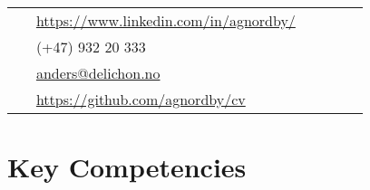 \documentclass[10pt]{article} %
\begin{document}
\begin{paracol}{2}

\parbox[top][0.12\textheight][c]{\linewidth}{ %
	\vspace{-0.04\textheight} %
	\colorbox{shade}{ %
		\begin{supertabular}{p{0.05\linewidth}|p{0.775\linewidth}} %
			\raisebox{-1pt}{\faLinkedinSquare} & \href{https://www.linkedin.com/in/agnordby/}{https://www.linkedin.com/in/agnordby/} \\ %
			\raisebox{-1pt}{\faPhone} & (+47) 932 20 333 \\ %
			\raisebox{0pt}{\small\faEnvelope} & \href{mailto:anders@delichon.no}{anders@delichon.no} \\ %
			\raisebox{-1pt}{\faGithub} & \href{https://https://github.com/agnordby/cv}{https://github.com/agnordby/cv} \\ %

		\end{supertabular}
	}
}


\section{Key Competencies}



\end{paracol}
\end{document}
